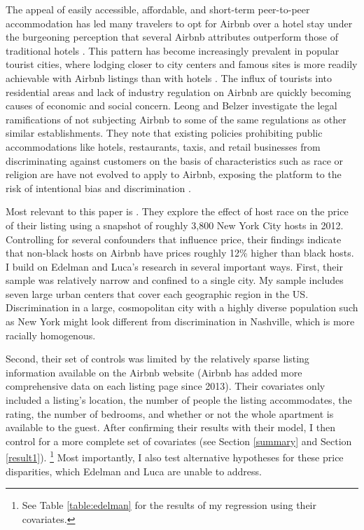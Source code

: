 The appeal of easily accessible, affordable, and short-term peer-to-peer accommodation has led many travelers to opt for Airbnb over a hotel stay under the burgeoning perception that several Airbnb attributes outperform those of traditional hotels \citep{guttentag}. This pattern has become increasingly prevalent in popular tourist cities, where lodging closer to city centers and famous sites is more readily achievable with Airbnb listings than with hotels \citep{gutierrez}. The influx of tourists into residential areas and lack of industry regulation on Airbnb are quickly becoming causes of economic and social concern. Leong and Belzer investigate the legal ramifications of not subjecting Airbnb to some of the same regulations as other similar establishments. They note that existing policies prohibiting public accommodations like hotels, restaurants, taxis, and retail businesses from discriminating against customers on the basis of characteristics such as race or religion are have not evolved to apply to Airbnb, exposing the platform to the risk of intentional bias and discrimination \citep{leong}. 


Most relevant to this paper is \cite{edelman}. They explore the effect of host race on the price of their listing using a snapshot of roughly 3,800 New York City hosts in 2012. Controlling for several confounders that influence price, their findings indicate that non-black hosts on Airbnb have prices roughly 12\% higher than black hosts. I build on Edelman and Luca's research in several important ways. First, their sample was relatively narrow and confined to a single city. My sample includes seven large urban centers that cover each geographic region in the US. Discrimination in a large, cosmopolitan city with a highly diverse population such as New York might look different from discrimination in Nashville, which is more racially homogenous.

Second, their set of controls was limited by the relatively sparse listing information available on the Airbnb website (Airbnb has added more comprehensive data on each listing page since 2013). Their covariates only included a listing's location, the number of people the listing accommodates, the rating, the number of bedrooms, and whether or not the whole apartment is available to the guest. After confirming their results with their model, I then control for a more complete set of covariates (see Section \ref{summary} and Section \ref{result1}).%
	\footnote{See Table \ref{table:edelman} for the results of my regression using their covariates.} 
Most importantly, I also test alternative hypotheses for these price disparities, which Edelman and Luca are unable to address. 

